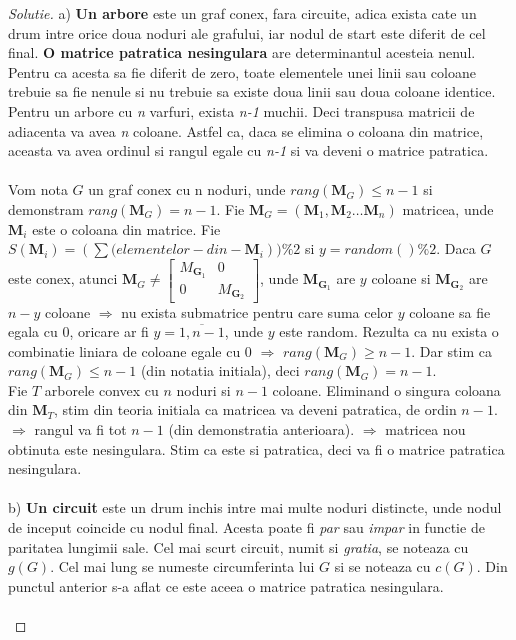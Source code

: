 \documentclass[12pt]{article}
\begin{document}
\begin{proof}[Solutie]
a) \textbf{Un arbore} este un graf conex, fara circuite, adica exista cate un drum intre orice doua noduri ale grafului, iar nodul de start este diferit de cel final. \textbf{O matrice patratica nesingulara} are determinantul acesteia nenul. Pentru ca acesta sa fie diferit de zero, toate elementele unei linii sau coloane trebuie sa fie nenule si nu trebuie sa existe doua linii sau doua coloane identice.\\
Pentru un arbore cu \textit{n} varfuri, exista \textit{n-1} muchii. Deci transpusa matricii de adiacenta va avea \textit{n} coloane. Astfel ca, daca se elimina o coloana din matrice, aceasta va avea ordinul si rangul egale cu \textit{n-1} si va deveni o matrice patratica.\\\\
Vom nota \(G\) un graf conex cu n noduri, unde \(rang(\mathbf{M}_{G})\leq{n-1}\) si demonstram \(rang(\mathbf{M}_{G})=n-1\). Fie \(\mathbf{M}_{G} = (\mathbf{M}_{1},\mathbf{M}_{2}\ldots\mathbf{M}_{n})\) matricea, unde \(\mathbf{M}_{i}\) este o coloana din matrice. Fie \(S(\mathbf{M}_{i})=(\sum{(elementelor-din-\mathbf{M}_{i}})) \% 2\) si \(y = random() \% 2\). Daca \(G\) este conex, atunci \(\mathbf{M}_{G}\neq{
\begin{bmatrix}
    M_{\mathbf{G}_{1}}       & 0 \\
   0       & M_{\mathbf{G}_{2}} 
\end{bmatrix}}\), unde \(\mathbf{M}_{\mathbf{G}_{1}}\) are \(y\) coloane si \(\mathbf{M}_{\mathbf{G}_{2}}\) are \(n-y\) coloane \(\Rightarrow\) nu exista submatrice pentru care suma celor \(y\) coloane sa fie egala cu 0, oricare ar fi \(y=\overline{1, n-1}\), unde \(y\) este random. Rezulta ca nu exista o combinatie liniara de coloane egale cu 0 \(\Rightarrow\) \(rang(\mathbf{M}_{G})\geq{n-1}\). Dar stim ca \(rang(\mathbf{M}_{G})\leq{n-1}\) (din notatia initiala), deci \(rang(\mathbf{M}_{G}) = n-1\). \\
Fie \(T\) arborele convex cu \(n\) noduri si \(n-1\) coloane. Eliminand o singura coloana din \(\mathbf{M}_{T}\), stim din teoria initiala ca matricea va deveni patratica, de ordin \(n-1\). \(\Rightarrow\) rangul va fi tot \(n-1\) (din demonstratia anterioara). \(\Rightarrow\) matricea nou obtinuta este nesingulara. Stim ca este si patratica, deci va fi o matrice patratica nesingulara.\\\\
b) \textbf{Un circuit} este un drum inchis intre mai multe noduri distincte, unde nodul de inceput coincide cu nodul final. Acesta poate fi \textit{par} sau \textit{impar} in functie de paritatea lungimii sale. Cel mai scurt circuit, numit si \textit{gratia}, se noteaza cu \(g(G)\). Cel mai lung se numeste circumferinta lui \(G\) si se noteaza cu \(c(G)\).  Din punctul anterior s-a aflat ce este aceea o matrice patratica nesingulara.\\\\

\end{proof}
\end{document}
